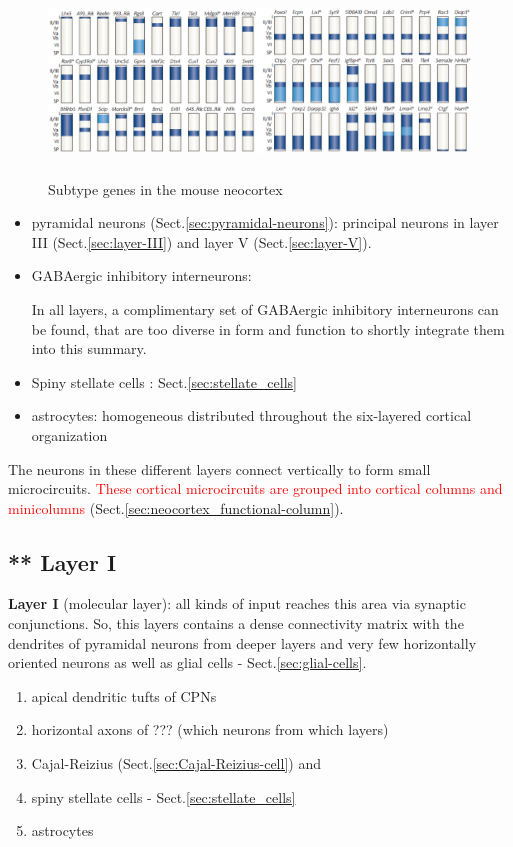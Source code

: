 \begin{figure}[htb]
  \centerline{\includegraphics[height=5cm]{./images/neocortical-genes.eps}}
  \caption{Subtype genes in the mouse neocortex}\label{fig:neocortical-genes}
\end{figure}

\begin{itemize}
  \item pyramidal neurons (Sect.\ref{sec:pyramidal-neurons}): principal neurons
  in layer III (Sect.\ref{sec:layer-III}) and layer V (Sect.\ref{sec:layer-V}).

  \item GABAergic inhibitory interneurons:
  
In all layers, a complimentary set of GABAergic inhibitory interneurons can be
found, that are too diverse in form and function to shortly integrate them into
this summary.
  
  \item Spiny stellate cells : Sect.\ref{sec:stellate_cells}
  
  \item astrocytes:
  homogeneous distributed throughout the six-layered cortical organization
\end{itemize}
The neurons in these different layers connect vertically to form small
microcircuits. \textcolor{red}{These cortical microcircuits are grouped into
cortical columns and minicolumns} (Sect.\ref{sec:neocortex_functional-column}).

\subsection{** Layer I}
\label{sec:layer-I}

{\bf Layer I} (molecular layer): all kinds of input reaches this area via
synaptic conjunctions. So, this layers contains a dense connectivity matrix with
the dendrites of pyramidal neurons from deeper layers and very few horizontally
oriented neurons as well as glial cells - Sect.\ref{sec:glial-cells}.
\begin{enumerate}
  \item apical dendritic tufts of CPNs 
  \item horizontal axons of ??? (which neurons from which layers)
  \item Cajal-Reizius (Sect.\ref{sec:Cajal-Reizius-cell}) and 
  \item spiny stellate cells - Sect.\ref{sec:stellate_cells}
  \item astrocytes
\end{enumerate}

